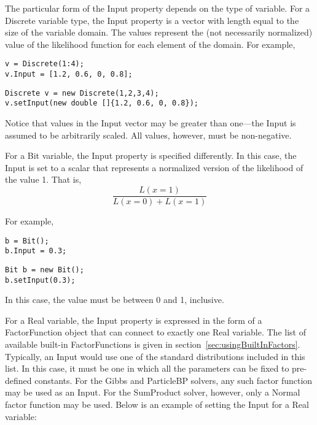 The particular form of the Input property depends on the type of variable.  For a Discrete variable type, the Input property is a vector with length equal to the size of the variable domain.  The values represent the (not necessarily normalized) value of the likelihood function for each element of the domain.  For example,

\ifmatlab

\begin{lstlisting}
v = Discrete(1:4);
v.Input = [1.2, 0.6, 0, 0.8];
\end{lstlisting}

\fi

\ifjava
\begin{lstlisting}
Discrete v = new Discrete(1,2,3,4);
v.setInput(new double []{1.2, 0.6, 0, 0.8});
\end{lstlisting}

\fi

Notice that values in the Input vector may be greater than one---the Input is assumed to be arbitrarily scaled.  All values, however, must be non-negative.

For a Bit variable, the Input property is specified differently.  In this case, the Input is set to a scalar that represents a normalized version of the likelihood of the value 1.  That is,
%
\[
\frac{L(x=1)}{L(x=0) + L(x=1)}
\]

For example,

\ifmatlab

\begin{lstlisting}
b = Bit();
b.Input = 0.3;
\end{lstlisting}

\fi

\ifjava
\begin{lstlisting}
Bit b = new Bit();
b.setInput(0.3);
\end{lstlisting}
\fi

In this case, the value must be between 0 and 1, inclusive.

For a Real variable, the Input property is expressed in the form of a FactorFunction object that can connect to exactly one Real variable.  The list of available built-in FactorFunctions is given in section~\ref{sec:usingBuiltInFactors}.  Typically, an Input would use one of the standard distributions included in this list.  In this case, it must be one in which all the parameters can be fixed to pre-defined constants.  For the Gibbs and ParticleBP solvers, any such factor function may be used as an Input.  For the SumProduct solver, however, only a Normal factor function may be used.  Below is an example of setting the Input for a Real variable:

